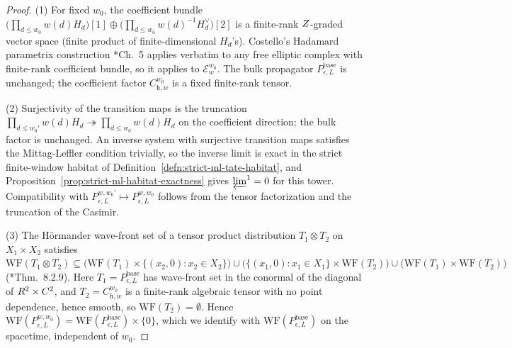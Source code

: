 \begin{proof}
  (1) For fixed $w_0$, the coefficient bundle
  $\bigl(\prod_{d\leq w_0}w(d)H_d\bigr)[1]\oplus
  \bigl(\prod_{d\leq w_0}w(d)^{-1}H_d^\vee\bigr)[2]$ is a finite-rank
  $Z$-graded vector space (finite product of finite-dimensional
  $H_d$'s). Costello's Hadamard parametrix construction
  \cite{costello-renormalization}*{Ch.~5} applies verbatim to any free
  elliptic complex with finite-rank coefficient bundle, so it applies
  to $\mathcal E_w^{w_0}$. The bulk propagator
  $P_{\epsilon,L}^{\mathrm{base}}$ is unchanged; the coefficient
  factor $C_{\mathfrak h,w}^{w_0}$ is a fixed finite-rank tensor.

  (2) Surjectivity of the transition maps is the truncation
  $\prod_{d\leq w_0'}w(d)H_d\twoheadrightarrow\prod_{d\leq w_0}w(d)H_d$
  on the coefficient direction; the bulk factor is unchanged. An
  inverse system with surjective transition maps satisfies the
  Mittag-Leffler condition trivially, so the inverse limit is exact in
  the strict finite-window habitat of
  Definition~\ref{defn:strict-ml-tate-habitat}, and
  Proposition~\ref{prop:strict-ml-habitat-exactness} gives
  \(\varprojlim^1=0\) for this tower. Compatibility with
  $P_{\epsilon,L}^{w,w_0'}\mapsto P_{\epsilon,L}^{w,w_0}$ follows from
  the tensor factorization and the truncation of the Casimir.

  (3) The Hörmander wave-front set of a tensor product distribution
  $T_1\otimes T_2$ on $X_1\times X_2$ satisfies
  $\mathrm{WF}(T_1\otimes T_2)\subseteq\bigl(\mathrm{WF}(T_1)\times
  \{(x_2,0):x_2\in X_2\}\bigr)\cup\bigl(\{(x_1,0):x_1\in X_1\}\times
  \mathrm{WF}(T_2)\bigr)\cup\bigl(\mathrm{WF}(T_1)\times
  \mathrm{WF}(T_2)\bigr)$ (\cite{hormander-vol1}*{Thm.~8.2.9}). Here
  $T_1=P_{\epsilon,L}^{\mathrm{base}}$ has wave-front set in the
  conormal of the diagonal of $R^2\times C^2$, and
  $T_2=C_{\mathfrak h,w}^{w_0}$ is a finite-rank algebraic tensor
  with no point dependence, hence smooth, so
  $\mathrm{WF}(T_2)=\emptyset$. Hence
  $\mathrm{WF}(P_{\epsilon,L}^{w,w_0})=
  \mathrm{WF}(P_{\epsilon,L}^{\mathrm{base}})\times\{0\}$, which we
  identify with $\mathrm{WF}(P_{\epsilon,L}^{\mathrm{base}})$ on the
  spacetime, independent of $w_0$.
\end{proof}

